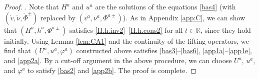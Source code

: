 \documentclass[twoside,11pt]{article}
\numberwithin{equation}{section}
\begin{document}
\begin{proof}
	
	\vspace*{2mm}
	.\quad
Note that $H^a$ and $u^a$ are the solutions of the equations \eqref{bas4} (with $(\mathring{v},\mathring{\nu},\mathring{\Phi}^{\pm})$ replaced by $(v^a,\nu^a,\Phi^{a\pm})$).
As in Appendix \ref{app:C}, we can show that $(H^a, h^a, \Phi^{a\pm})$ satisfies
	\eqref{H.h.inv2}--\eqref{H.h.cons2} for all $t\in\mathbb{R}$, since they hold initially.
	Using Lemma \ref{lem:CA1} and the continuity of the lifting operators, we find that
	$(U^a,u^a,\varphi^a)$ constructed above satisfies \eqref{bas3}--\eqref{bas6}, \eqref{app1a}--\eqref{app1e}, and \eqref{app2a}.
	By a cut-off argument in the above procedure, we can choose  $U^a$, $u^a$,  and $\varphi^a$  to satisfy \eqref{bas2} and \eqref{app2b}. The proof is complete.
\end{proof}
\end{document}
